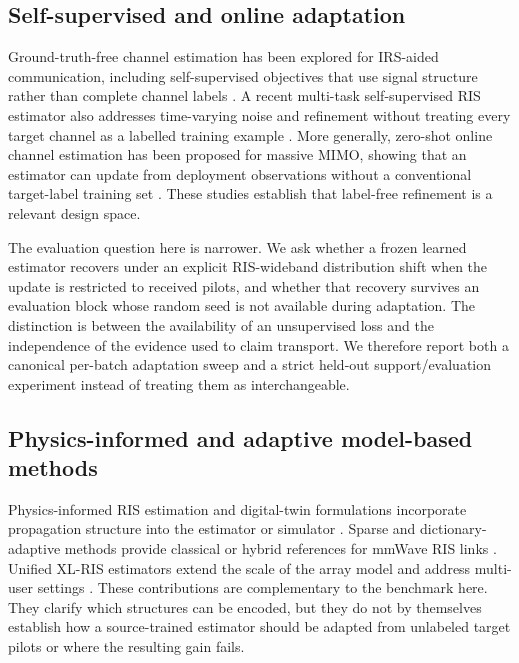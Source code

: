\documentclass[10pt,twocolumn]{article}
\begin{document}
\subsection{Self-supervised and online adaptation}

Ground-truth-free channel estimation has been explored for IRS-aided communication, including self-supervised objectives that use signal structure rather than complete channel labels \cite{zhang2023selfsupervised}. A recent multi-task self-supervised RIS estimator also addresses time-varying noise and refinement without treating every target channel as a labelled training example \cite{bai2026multitask}. More generally, zero-shot online channel estimation has been proposed for massive MIMO, showing that an estimator can update from deployment observations without a conventional target-label training set \cite{gao2026zeroshot}. These studies establish that label-free refinement is a relevant design space.

The evaluation question here is narrower. We ask whether a frozen learned estimator recovers under an explicit RIS-wideband distribution shift when the update is restricted to received pilots, and whether that recovery survives an evaluation block whose random seed is not available during adaptation. The distinction is between the availability of an unsupervised loss and the independence of the evidence used to claim transport. We therefore report both a canonical per-batch adaptation sweep and a strict held-out support/evaluation experiment instead of treating them as interchangeable.

\subsection{Physics-informed and adaptive model-based methods}

Physics-informed RIS estimation and digital-twin formulations incorporate propagation structure into the estimator or simulator \cite{hybridPhysicsRis2026,han2025digitaltwin}. Sparse and dictionary-adaptive methods provide classical or hybrid references for mmWave RIS links \cite{adaptiveRisGlobecom2024,superResolutionRis2026}. Unified XL-RIS estimators extend the scale of the array model and address multi-user settings \cite{unifiedXlRis2024}. These contributions are complementary to the benchmark here. They clarify which structures can be encoded, but they do not by themselves establish how a source-trained estimator should be adapted from unlabeled target pilots or where the resulting gain fails.
\end{document}
